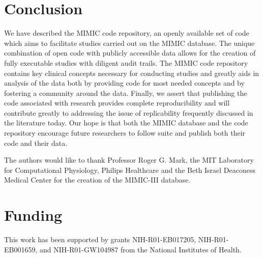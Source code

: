 \documentclass{elsart}
\begin{document}
\section{Conclusion}

We have described the MIMIC code repository, an openly available set of code which aims to facilitate studies carried out on the MIMIC database. The unique combination of open code with publicly accessible data allows for the creation of fully executable studies with diligent audit trails. The MIMIC code repository contains key clinical concepts necessary for conducting studies and greatly aids in analysis of the data both by providing code for most needed concepts and by fostering a community around the data. Finally, we assert that publishing the code associated with research provides complete reproducibility and will contribute greatly to addressing the issue of replicability frequently discussed in the literature today. Our hope is that both the MIMIC database and the code repository encourage future researchers to follow suite and publish both their code and their data.

\begin{ack}
The authors would like to thank Professor Roger G. Mark, the MIT Laboratory for Computational Physiology, Philips Healthcare and the Beth Israel Deaconess Medical Center for the creation of the MIMIC-III database.%
\end{ack}

\section*{Funding}

This work has been supported by grants NIH-R01-EB017205, NIH-R01-EB001659, and NIH-R01-GW104987 from the National Institutes of Health.%




\end{document}

